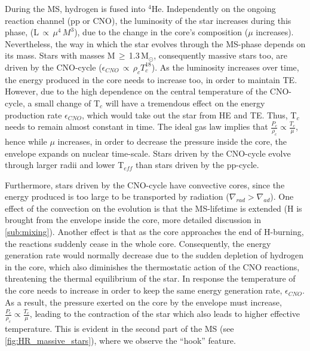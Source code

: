 During the MS, hydrogen is fused into $^4$He. Independently on the ongoing reaction channel (pp or CNO), the luminosity of the star increases during this phase, (L$\,\propto\,\mu^{4}\,M^3$), due to the change in the core's composition ($\mu$ increases). Nevertheless, the way in which the star evolves through the MS-phase depends on its mass. Stars with masses M\,$\geq$\,1.3\,M$_\odot$, consequently massive stars too, are driven by the CNO-cycle ($\epsilon_{CNO}\,\propto\,\rho_{c}T^{18}_{c}$). As the luminosity increases over time, the energy produced in the core needs to increase too, in order to maintain TE. However, due to the high dependence on the central temperature of the CNO-cycle, a small change of T$_c$ will have a tremendous effect on the energy production rate $\epsilon_{CNO}$, which would take out the star from HE and TE. Thus, T$_c$ needs to remain almost constant in time. The ideal gas law implies that $\frac{P_c}{\rho_c} \propto \frac{T_c}{\mu}$, hence while $\mu$ increases, in order to decrease the pressure inside the core, the envelope expands on nuclear time-scale. Stars driven by the CNO-cycle evolve through larger radii and lower T$_{eff}$ than stars driven by the pp-cycle. 

Furthermore, stars driven by the CNO-cycle have convective cores, since the energy produced is too large to be transported by radiation ($\nabla_{rad} > \nabla_{ad}$). One effect of the convection on the evolution is that the MS-lifetime is extended (H is brought from the envelope inside the core, more detailed discussion in \cref{sub:mixing}). Another effect is that as the core approaches the end of H-burning, the reactions suddenly cease in the whole core. Consequently, the energy generation rate would normally decrease due to the sudden depletion of hydrogen in the core, which also diminishes the thermostatic action of the CNO reactions, threatening the thermal equilibrium of the star. In response the temperature of the core needs to increase in order to keep the same energy generation rate, $\epsilon_{CNO}$. As a result, the pressure exerted on the core by the envelope must increase, $\frac{P_c}{\rho_c} \propto \frac{T_c}{\mu}$, leading to the contraction of the star which also leads to higher effective temperature. This is evident in the second part of the MS (see \cref{fig:HR_massive_stars}), where we observe the ``hook'' feature. 

